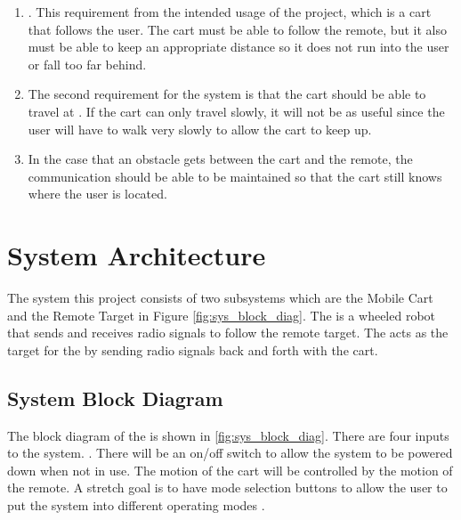 \documentclass[letterpaper,12pt]{article}   %
\begin{document}
\begin{enumerate}
\item {}. %
%
   This requirement
   from the intended usage of the project, which is a cart
  that follows the user. The cart must be able to follow the remote, but it also
  must be able to keep an appropriate distance so it does not run into the user
  or fall too far behind.

\item   The second requirement for the system is that the cart should be able to travel at . If the cart can only travel slowly, it will not be as useful since the user will have to walk very slowly to allow the cart to keep up.

\item   {} In the case that an obstacle gets between the cart and the remote, the communication should be able to be maintained so that the cart still knows where the user is located.
\end{enumerate}


\section{System Architecture}
The  system   this project
consists of two subsystems which are the Mobile Cart and the Remote Target
 in Figure
\ref{fig:sys_block_diag}. The 
is a wheeled robot that sends and receives radio signals to follow the remote
target. The  acts as the target for the
 by sending radio signals back and forth with the cart.

\subsection{System Block Diagram}
The  block diagram of the  is shown in
\autoref{fig:sys_block_diag}. There are four inputs to the 
system.  . There will
be an on/off switch to allow the system to be powered down when not in use. The
motion of the cart will be controlled by the motion of the remote. A stretch
goal is to have mode selection buttons to allow the user to put the system into
different operating modes .
\end{document}
